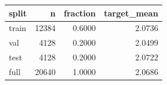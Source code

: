 \begin{tabular}{lrrr}
\toprule
split & n & fraction & target\_mean \\
\midrule
train & 12384 & 0.6000 & 2.0736 \\
val & 4128 & 0.2000 & 2.0499 \\
test & 4128 & 0.2000 & 2.0722 \\
full & 20640 & 1.0000 & 2.0686 \\
\bottomrule
\end{tabular}

